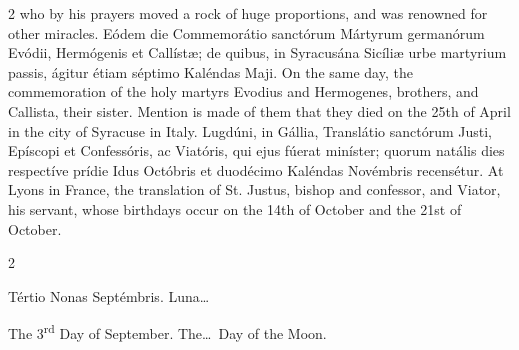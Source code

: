 \begin{paracol}{2}
 who by his prayers moved a rock of huge proportions, and was renowned for 
 other miracles.
\switchcolumn*
{}
Eódem die Commemorátio 
 sanctórum Mártyrum germanórum Evódii, Hermógenis et Callístæ; de quibus, in 
 Syracusána Sicíliæ urbe martyrium passis, ágitur étiam séptimo Kaléndas Maji.
\switchcolumn
{}
On the same day, the commemoration 
 of the holy martyrs Evodius and Hermogenes, brothers, and Callista, their 
 sister. Mention is made of them that they died on the 25th of April in 
 the city of Syracuse in Italy.
\switchcolumn*
{}
Lugdúni, in Gállia, 
 Translátio sanctórum Justi, Epíscopi et Confessóris, ac Viatóris, qui ejus 
 fúerat miníster; quorum natális dies respectíve prídie Idus Octóbris et 
 duodécimo Kaléndas Novémbris recensétur.
\switchcolumn
{}
At Lyons in France, the translation 
 of St. Justus, bishop and confessor, and Viator, his servant, whose 
 birthdays occur on the 14th of October and the 21st of October.
\switchcolumn*
{}
\end{paracol}


\begin{paracol}{2}
\begin{center}{\color{gregoriocolor} Tértio Nonas Septémbris. 
 Luna\dots\ }\end{center}
\switchcolumn
{}
\begin{center}{\color{gregoriocolor} The   3\textsuperscript{rd} Day of 
 September. The\dots\ Day of the Moon.}\end{center}
\end{paracol}

